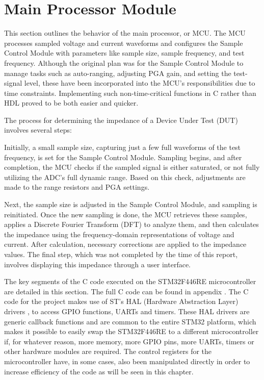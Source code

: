 \chapter{Main Processor Module} \label{sec:MCU}

This section outlines the behavior of the main processor, or MCU. The MCU processes sampled voltage and current waveforms and configures the Sample Control Module with parameters like sample size, sample frequency, and test frequency. Although the original plan was for the Sample Control Module to manage tasks such as auto-ranging, adjusting PGA gain, and setting the test-signal level, these have been incorporated into the MCU's responsibilities due to time constraints. Implementing such non-time-critical functions in C rather than HDL proved to be both easier and quicker.

The process for determining the impedance of a Device Under Test (DUT) involves several steps:

Initially, a small sample size, capturing just a few full waveforms of the test frequency, is set for the Sample Control Module. Sampling begins, and after completion, the MCU checks if the sampled signal is either saturated, or not fully utilizing the ADC's full dynamic range. Based on this check, adjustments are made to the range resistors and PGA settings. 

Next, the sample size is adjusted in the Sample Control Module, and sampling is reinitiated. Once the new sampling is done, the MCU retrieves these samples, applies a Discrete Fourier Transform (DFT) to analyze them, and then calculates the impedance using the frequency-domain representations of voltage and current. After calculation, necessary corrections are applied to the impedance values. The final step, which was not completed by the time of this report, involves displaying this impedance through a user interface.

The key segments of the C code executed on the STM32F446RE microcontroller are detailed in this section. The full C code can be found in appendix . The C code for the project makes use of ST's HAL (Hardware Abstraction Layer) drivers \cite{STHAL}, to access GPIO functions, UARTs and timers. These HAL drivers are generic callback functions and are common to the entire STM32 platform, which makes it possible to easily swap the STM32F446RE to a different microcontroller if, for whatever reason, more memory, more GPIO pins, more UARTs, timers or other hardware modules are required. The control registers for the microcontroller have, in some cases, also been manipulated directly in order to increase efficiency of the code as will be seen in this chapter. 




